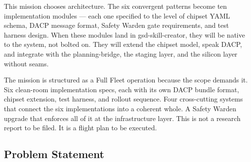 \documentclass[11pt,letterpaper]{article}
\begin{document}
This mission chooses architecture. The six convergent patterns become ten implementation modules --- each one specified to the level of chipset YAML schema, DACP message format, Safety Warden gate requirements, and test harness design. When these modules land in gsd-skill-creator, they will be native to the system, not bolted on. They will extend the chipset model, speak DACP, and integrate with the planning-bridge, the staging layer, and the silicon layer without seams.

The mission is structured as a Full Fleet operation because the scope demands it. Six clean-room implementation specs, each with its own DACP bundle format, chipset extension, test harness, and rollout sequence. Four cross-cutting systems that connect the six implementations into a coherent whole. A Safety Warden upgrade that enforces all of it at the infrastructure layer. This is not a research report to be filed. It is a flight plan to be executed.

\subsection{Problem Statement}
\end{document}
